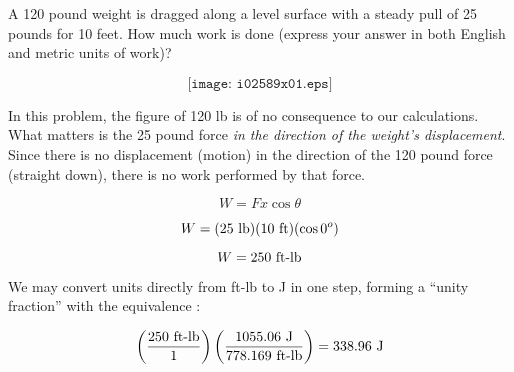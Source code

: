 

A 120 pound weight is dragged along a level surface with a steady pull of 25 pounds for 10 feet.  How much work is done (express your answer in both English and metric units of work)?

$$\texttt{[image: i02589x01.eps]}$$







In this problem, the figure of 120 lb is of no consequence to our calculations.  What matters is the 25 pound force {\it in the direction of the weight's displacement}.  Since there is no displacement (motion) in the direction of the 120 pound force (straight down), there is no work performed by that force.


$$W = Fx \cos \theta$$

$$W = (25 \hbox{ lb})(10 \hbox{ ft})(\cos 0^o)$$

$$W = 250 \hbox{ ft-lb}$$

We may convert units directly from ft-lb to J in one step, forming a ``unity fraction'' with the equivalence :

$$\left(250 \hbox{ ft-lb} \over 1 \right) \left(1055.06 \hbox{ J} \over 778.169 \hbox{ ft-lb} \right) = 338.96 \hbox{ J}$$











